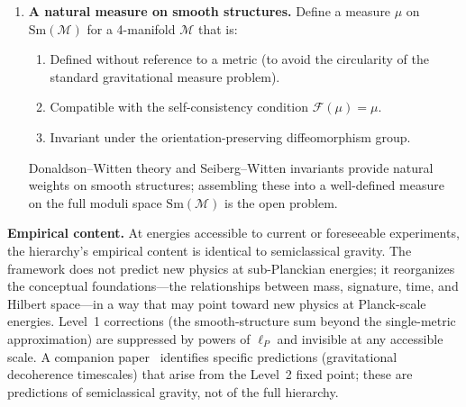 \documentclass[12pt,a4paper]{article}
\theoremstyle{definition}
\theoremstyle{remark}
\begin{document}
\begin{enumerate}
\item \textbf{A natural measure on smooth structures.}
Define a measure $\mu$ on $\mathrm{Sm}(\mathcal{M})$ for a 4-manifold
$\mathcal{M}$ that is:
\begin{enumerate}
\item Defined without reference to a metric (to avoid the circularity of
the standard gravitational measure problem).
\item Compatible with the self-consistency condition
$\mathcal{F}(\mu) = \mu$.
\item Invariant under the orientation-preserving diffeomorphism group.
\end{enumerate}
Donaldson--Witten theory and Seiberg--Witten invariants provide natural
weights on smooth structures; assembling these into a well-defined
measure on the full moduli space $\mathrm{Sm}(\mathcal{M})$ is the open
problem.

\end{enumerate}

\medskip

\noindent\textbf{Empirical content.} At energies accessible to current
or foreseeable experiments, the hierarchy's empirical content is
identical to semiclassical gravity. The framework does not predict new
physics at sub-Planckian energies; it reorganizes the conceptual
foundations---the relationships between mass, signature, time, and
Hilbert space---in a way that may point toward new physics at Planck-scale
energies. Level~1 corrections (the smooth-structure sum beyond the
single-metric approximation) are suppressed by powers of $\ell_P$ and
invisible at any accessible scale. A companion
paper~\cite{ggd} identifies specific predictions (gravitational
decoherence timescales) that arise from the Level~2 fixed point; these
are predictions of semiclassical gravity, not of the full hierarchy.

\medskip
\end{document}
